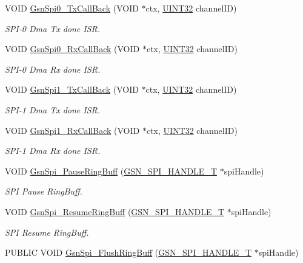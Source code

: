 \begin{DoxyCompactItemize}
VOID \hyperlink{a00655_ga0546bc1bf8f01326d3252b07af8551d1}{GsnSpi0\_\-TxCallBack} (VOID $\ast$ctx, \hyperlink{a00660_gae1e6edbbc26d6fbc71a90190d0266018}{UINT32} channelID)
\begin{DoxyCompactList}\small\item\em SPI-\/0 Dma Tx done ISR. \end{DoxyCompactList}\item 
VOID \hyperlink{a00655_gab0a94dc945496de3fae944b7a20b1748}{GsnSpi0\_\-RxCallBack} (VOID $\ast$ctx, \hyperlink{a00660_gae1e6edbbc26d6fbc71a90190d0266018}{UINT32} channelID)
\begin{DoxyCompactList}\small\item\em SPI-\/0 Dma Rx done ISR. \end{DoxyCompactList}\item 
VOID \hyperlink{a00655_gaa25e67e9580c5965c4d2861e3a515b76}{GsnSpi1\_\-TxCallBack} (VOID $\ast$ctx, \hyperlink{a00660_gae1e6edbbc26d6fbc71a90190d0266018}{UINT32} channelID)
\begin{DoxyCompactList}\small\item\em SPI-\/1 Dma Tx done ISR. \end{DoxyCompactList}\item 
VOID \hyperlink{a00655_ga591fe7e46faaf3a5875c60705bd58fba}{GsnSpi1\_\-RxCallBack} (VOID $\ast$ctx, \hyperlink{a00660_gae1e6edbbc26d6fbc71a90190d0266018}{UINT32} channelID)
\begin{DoxyCompactList}\small\item\em SPI-\/1 Dma Rx done ISR. \end{DoxyCompactList}\item 
VOID \hyperlink{a00655_gaff8470ba74c4dcca916bbeff57e4bd7d}{GsnSpi\_\-PauseRingBuff} (\hyperlink{a00238}{GSN\_\-SPI\_\-HANDLE\_\-T} $\ast$spiHandle)
\begin{DoxyCompactList}\small\item\em SPI Pause RingBuff. \end{DoxyCompactList}\item 
VOID \hyperlink{a00655_ga0d08ec80f335e1b0ed90f7c59367f9b2}{GsnSpi\_\-ResumeRingBuff} (\hyperlink{a00238}{GSN\_\-SPI\_\-HANDLE\_\-T} $\ast$spiHandle)
\begin{DoxyCompactList}\small\item\em SPI Resume RingBuff. \end{DoxyCompactList}\item 
PUBLIC VOID \hyperlink{a00655_ga1c2eb2ee1ac85757bc73cee12de1f83a}{GsnSpi\_\-FlushRingBuff} (\hyperlink{a00238}{GSN\_\-SPI\_\-HANDLE\_\-T} $\ast$spiHandle)

\end{DoxyCompactItemize}
